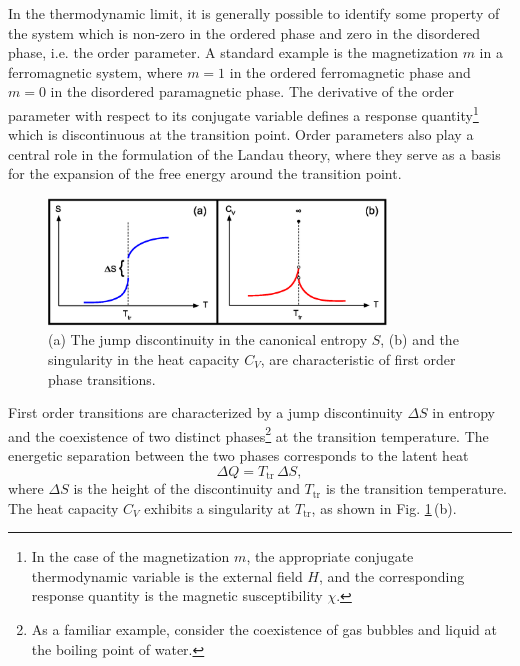 \documentclass[12pt]{report}
\begin{document}
In the thermodynamic limit, it is generally possible to identify some property of the system which is non-zero in the ordered phase and zero in the disordered phase, i.e. the order parameter\cite{Bachmann2014,Landau2000}. A standard example is the magnetization $m$ in a ferromagnetic system, where $m = 1$ in the ordered ferromagnetic phase and $m = 0$ in the disordered paramagnetic phase. The derivative of the order parameter with respect to its conjugate variable defines a response quantity\footnote{In the case of the magnetization $m$, the appropriate conjugate thermodynamic variable is the external field $H$, and the corresponding response quantity is the magnetic susceptibility $\chi$.} which is discontinuous at the transition point. Order parameters also play a central role in the formulation of the Landau theory, where they serve as a basis for the expansion of the free energy around the transition point\cite{Kardar2009}. 

\begin{figure}
\center
\includegraphics[width = 0.8\textwidth]{chapter2Figs/CanonicalFirstOrder.eps}
\caption{\label{fig:Fig_3}%
(a) The jump discontinuity in the canonical entropy $S$, (b) and the singularity in the heat capacity $C_{V}$, are characteristic of first order phase transitions.}
\end{figure} 

First order transitions are characterized by a jump discontinuity $\Delta S$ in entropy and the coexistence of two distinct phases\footnote{As a familiar example, consider the coexistence of gas bubbles and liquid at the boiling point of water.} at the transition temperature. The energetic separation between the two phases corresponds to the latent heat
\begin{equation}
\Delta Q = T_{\mathrm{tr}}\,\Delta S,
\end{equation}
where $\Delta S$ is the height of the discontinuity and $T_{\mathrm{tr}}$ is the transition temperature. The heat capacity $C_{V}$ exhibits a singularity at $T_{\mathrm{tr}}$, as shown in Fig. \ref{fig:Fig_3}\,(b).

\newpage
\end{document}
